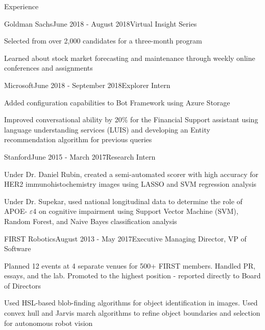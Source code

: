 \documentclass{resume} %
\begin{document}
\begin{rSection}{Experience}

\begin{rSubsection}{Goldman Sachs}{June 2018 - August 2018}{Virtual Insight Series}{}
\item Selected from over 2,000 candidates for a three-month program
\item Learned about stock market forecasting and maintenance through weekly online conferences and assignments
\end{rSubsection}



\begin{rSubsection}{Microsoft}{June 2018 - September 2018}{Explorer Intern}{}
\item Added configuration capabilities to Bot Framework using Azure Storage
\item Improved conversational ability by 20$\%$ for the Financial Support assistant using language understanding services (LUIS) and developing an Entity recommendation algorithm for previous queries
\end{rSubsection}


\begin{rSubsection}{Stanford}{June 2015 - March 2017}{Research Intern}{}
\item Under Dr. Daniel Rubin, created a semi-automated scorer with high accuracy for HER2 immunohistochemistry images using LASSO and SVM regression analysis
\item Under Dr. Supekar, used national longitudinal data to determine the role of APOE- $\varepsilon$4 on cognitive impairment using Support Vector Machine (SVM), Random Forest, and Naive Bayes classification analysis
\end{rSubsection}


\begin{rSubsection}{FIRST Robotics}{August 2013 - May 2017}{Executive Managing Director, VP of Software}{}
\item Planned 12 events at 4 separate venues for 500+ FIRST members. Handled PR, essays, and the lab. Promoted to the highest position - reported directly to Board of Directors
\item Used HSL-based blob-finding algorithms for object identification in images. Used convex hull and Jarvis march algorithms to refine object boundaries and selection for autonomous robot vision
\end{rSubsection}

\end{rSection}
\end{document}
